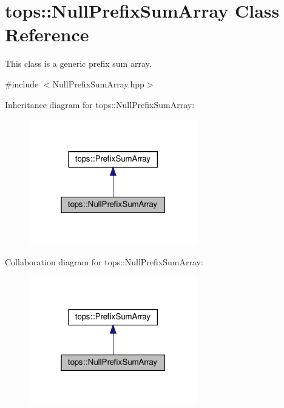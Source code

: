 \hypertarget{classtops_1_1NullPrefixSumArray}{}\section{tops\+:\+:Null\+Prefix\+Sum\+Array Class Reference}
\label{classtops_1_1NullPrefixSumArray}


This class is a generic prefix sum array.  




{\ttfamily \#include $<$Null\+Prefix\+Sum\+Array.\+hpp$>$}



Inheritance diagram for tops\+:\+:Null\+Prefix\+Sum\+Array\+:
\nopagebreak
\begin{figure}[H]
\begin{center}
\leavevmode
\includegraphics[width=208pt]{classtops_1_1NullPrefixSumArray__inherit__graph}
\end{center}
\end{figure}


Collaboration diagram for tops\+:\+:Null\+Prefix\+Sum\+Array\+:
\nopagebreak
\begin{figure}[H]
\begin{center}
\leavevmode
\includegraphics[width=208pt]{classtops_1_1NullPrefixSumArray__coll__graph}
\end{center}
\end{figure}
